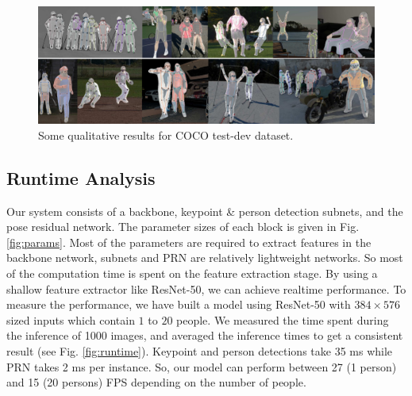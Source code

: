 \documentclass[runningheads]{llncs}
\begin{document}
\begin{figure}
\centering
\includegraphics[width=\textwidth]{Figures/samples-2.pdf}
\caption{Some qualitative results for COCO test-dev dataset.}
\label{fig:samples}
\end{figure}


\subsection{Runtime Analysis}
Our system consists of a backbone, keypoint \& person detection subnets, and the pose residual network. The parameter sizes of each block is given in Fig. \ref{fig:params}. Most of the parameters are required to extract features in the backbone network, subnets and PRN are relatively lightweight networks. So most of the computation time is spent on the feature extraction stage. By using a shallow feature extractor like ResNet-50, we can achieve realtime performance. To measure the performance, we have built a model using ResNet-50 with $384 \times 576$ sized inputs which contain $1$ to $20$ people. We measured the time spent during the inference of 1000 images, and averaged the inference times to get a consistent result (see Fig. \ref{fig:runtime}). Keypoint and person detections take 35 ms while PRN takes 2 ms per instance. So, our model can perform between 27 (1 person) and 15 (20 persons) FPS depending on the number of people. 
\end{document}
